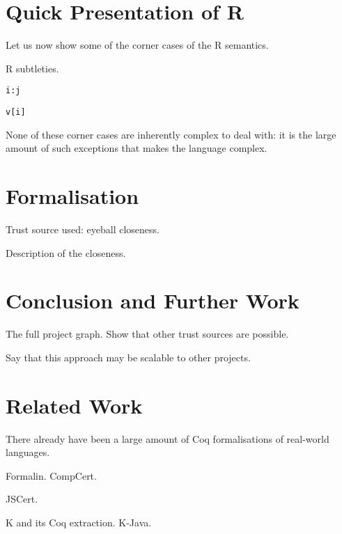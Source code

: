 \documentclass[9pt, sigplan, natbib=false, screen=true]{acmart}
\newcommand\Coq{Coq}
\newcommand\R{R}
\begin{document}
\section{Quick Presentation of \R{}}
\label{sec:presentation}

Let us now show some of the corner cases of the \R{} semantics.

\R{} subtleties.

\texttt{i:j}

\begin{verbatim}
v[i]
\end{verbatim}

None of these corner cases are inherently complex to deal with:
it is the large amount of such exceptions that makes the language complex.


\section{Formalisation}
\label{sec:formalisation}

Trust source used: eyeball closeness.

Description of the closeness.


\section{Conclusion and Further Work}
\label{sec:conclusion}

The full project graph.
Show that other trust sources are possible.

Say that this approach may be scalable to other projects.


\section{Related Work}
\label{sec:related:work}

There already have been a large amount of \Coq{} formalisations
of real-world languages.

Formalin.
CompCert.

JSCert.

K and its \Coq{} extraction.
K-Java.


\printbibliography
\end{document}
